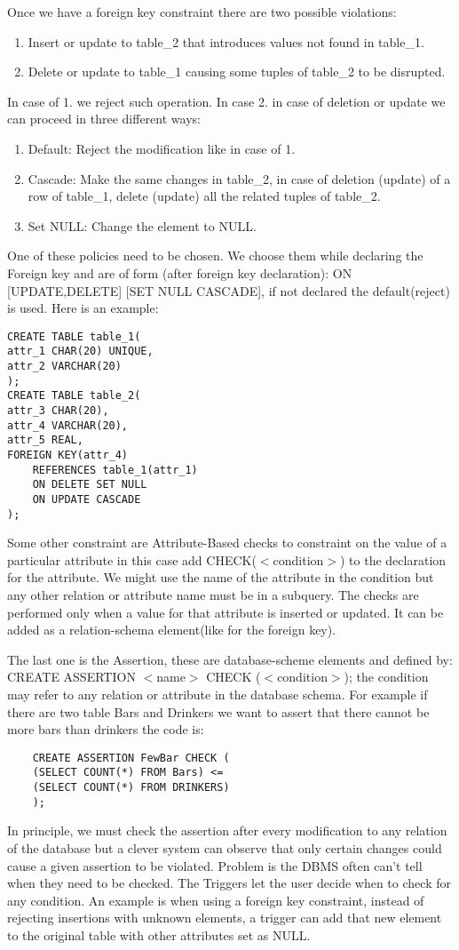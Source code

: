 \documentclass[a4page, 11pt]{article}
\begin{document}
Once we have a foreign key constraint there are two possible violations:
\begin{enumerate}[noitemsep]
	\item Insert or update to table\_2 that introduces values not found in table\_1.
	\item Delete or update to table\_1 causing some tuples of table\_2 to be disrupted.
\end{enumerate}
In case of 1. we reject such operation. In case 2. in case of deletion or update we can proceed in three different ways:
\begin{enumerate}[noitemsep]
	\item Default: Reject the modification like in case of 1.
	\item Cascade: Make the same changes in table\_2, in case of deletion (update) of a row of table\_1, delete (update) all the related tuples of table\_2.
	\item Set NULL: Change the element to NULL.
\end{enumerate}
One of these policies need to be chosen. We choose them while declaring the Foreign key and are of form (after foreign key declaration): ON [UPDATE,DELETE] [SET NULL CASCADE], if not declared the default(reject) is used. Here is an example:
\begin{lstlisting}
CREATE TABLE table_1(
attr_1 CHAR(20) UNIQUE,
attr_2 VARCHAR(20)
);
CREATE TABLE table_2(
attr_3 CHAR(20),
attr_4 VARCHAR(20),
attr_5 REAL,
FOREIGN KEY(attr_4)
	REFERENCES table_1(attr_1)
	ON DELETE SET NULL
	ON UPDATE CASCADE
);
\end{lstlisting}

Some other constraint are Attribute-Based checks to constraint on the value of a particular attribute in this case add CHECK($<$condition$>$) to the declaration for the attribute. We might use the name of the attribute in the condition but any other relation or attribute name must be in a subquery.
The checks are performed only when a value for that attribute is inserted or updated.
It can be added as a relation-schema element(like for the foreign key).

The last one is the Assertion, these are database-scheme elements and defined by: \newline CREATE ASSERTION $<$name$>$ CHECK ($<$condition$>$); the condition may refer to any relation or attribute in the database schema.
For example if there are two table Bars and Drinkers we want to assert that there cannot be more bars than drinkers the code is:
\begin{lstlisting}
	CREATE ASSERTION FewBar CHECK (
	(SELECT COUNT(*) FROM Bars) <=
	(SELECT COUNT(*) FROM DRINKERS)
	);
\end{lstlisting}
In principle, we must check the assertion after every modification to any relation of the database but a clever system can observe that only certain changes could cause a given assertion to be violated. 
Problem is the DBMS often can't tell when they need to be checked. 
The Triggers let the user decide when to check for any condition.
An example is when using a foreign key constraint, instead of rejecting insertions with unknown elements, a trigger can add that new element to the original table with other attributes set as NULL.
\end{document}
